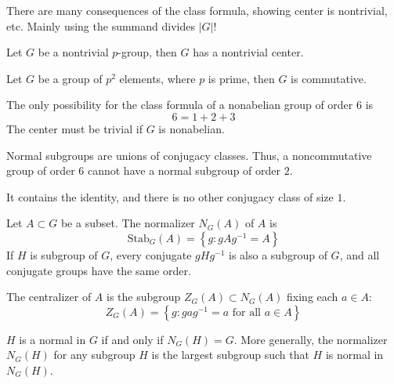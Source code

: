 \documentclass[openany]{book}
\begin{document}
\begin{warn}
    There are many consequences of the class formula, showing center is nontrivial, etc. Mainly using the summand divides $|G|$!
\end{warn}


\begin{thm}
    Let $G$ be a nontrivial $p$-group, then $G$ has a nontrivial center.
\end{thm}

\begin{prop}
    Let $G$ be a group of $p^2$ elements, where $p$ is prime, then $G$ is commutative.
\end{prop}

\begin{prop}
    The only possibility for the class formula of a nonabelian group of order $6$ is 
    \begin{equation*}
        6=1+2+3
    \end{equation*}
    The center must be trivial if $G$ is nonabelian.
\end{prop}


\begin{prop}
    Normal subgroups are unions of conjugacy classes. Thus, a noncommutative group of order $6$ cannot have a normal subgroup of order $2$.
\end{prop}
It contains the identity, and there is no other conjugacy class of size $1$.



\begin{defn}[normalizer]
    Let $A\subset G$ be a subset. The normalizer $N_G(A)$ of $A$ is 
    \begin{equation*}
        \text{Stab}_G(A)=\left\{g: gAg^{-1}=A\right\}
    \end{equation*}
    If $H$ is subgroup of $G$, every conjugate $gHg^{-1}$ is also a subgroup of $G$, and all conjugate groups have the same order.
\end{defn}
The centralizer of $A$ is the subgroup $Z_G(A)\subset N_G(A)$ fixing each $a\in A$:
    \begin{equation*}
        Z_G(A)=\left\{ g: gag^{-1}=a \text{ for all } a\in A\right\}
    \end{equation*}

\begin{prop}[*]
    $H$ is a normal in $G$ if and only if $N_G(H)=G$. More generally, the normalizer $N_G(H)$ for any subgroup $H$ is the largest subgroup such that $H$ is normal in $N_G(H)$.
\end{prop}
\end{document}
